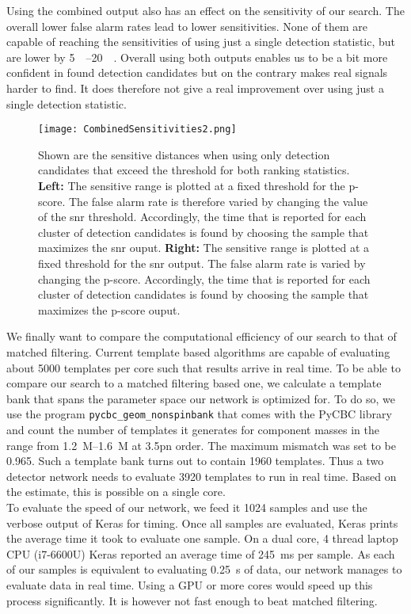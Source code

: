 Using the combined output also has an effect on the sensitivity of our search. The overall lower false alarm rates lead to lower sensitivities. None of them are capable of reaching the sensitivities of using just a single detection statistic, but are lower by \SIrange{5}{20}{\mega\parsec}. Overall using both outputs enables us to be a bit more confident in found detection candidates but on the contrary makes real signals harder to find. It does therefore not give a real improvement over using just a single detection statistic.\medskip\\
\begin{figure}
\centering
\texttt{[image: CombinedSensitivities2.png]}
\caption[Sensitivity of combined outputs]{Shown are the sensitive distances when using only detection candidates that exceed the threshold for both ranking statistics. \textbf{Left:} The sensitive range is plotted at a fixed threshold for the p-score. The false alarm rate is therefore varied by changing the value of the \gls{snr} threshold. Accordingly, the time that is reported for each cluster of detection candidates is found by choosing the sample that maximizes the \gls{snr} ouput. \textbf{Right:} The sensitive range is plotted at a fixed threshold for the \gls{snr} output. The false alarm rate is varied by changing the p-score. Accordingly, the time that is reported for each cluster of detection candidates is found by choosing the sample that maximizes the p-score ouput.}\label{fig:combined_sensitivities}
\end{figure}
We finally want to compare the computational efficiency of our search to that of matched filtering. Current template based algorithms are capable of evaluating about 5000 templates per core such that results arrive in real time. To be able to compare our search to a matched filtering based one, we calculate a template bank that spans the parameter space our network is optimized for. To do so, we use the program \verb|pycbc_geom_nonspinbank| that comes with the PyCBC library and count the number of templates it generates for component masses in the range from \SIrange{1.2}{1.6}{M_\odot} at 3.5\gls{pn} order. The maximum mismatch was set to be 0.965. Such a template bank turns out to contain 1960 templates. Thus a two detector network needs to evaluate 3920 templates to run in real time. Based on the estimate, this is possible on a single core.\\
To evaluate the speed of our network, we feed it 1024 samples and use the verbose output of Keras for timing. Once all samples are evaluated, Keras prints the average time it took to evaluate one sample. On a dual core, 4 thread laptop CPU (i7-6600U) Keras reported an average time of \SI{245}{\milli\s} per sample. As each of our samples is equivalent to evaluating \SI{0.25}{\s} of data, our network manages to evaluate data in real time. Using a GPU or more cores would speed up this process significantly. It is however not fast enough to beat matched filtering.\\
